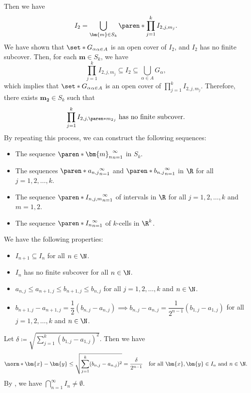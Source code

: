     Then we have
    \[
    I_{2} = \bigcup_{\bm{m} \in S_{k}} \paren*{\prod_{j = 1}^{k} I_{2, j, m_{j}}}.
    \]
    We have shown that $\set*{G_{\alpha}}_{\alpha \in A}$ is an open cover of $I_{2}$, and $I_{2}$ has no finite subcover.
    Then, for each $\bm{m} \in S_{k}$, we have
    \[
    \prod_{j = 1}^{k} I_{2, j, m_{j}} \subseteq I_{2} \subseteq \bigcup_{\alpha \in A} G_{\alpha},
    \]
    which implies that $\set*{G_{\alpha}}_{\alpha \in A}$ is an open cover of
    $\displaystyle \prod_{j = 1}^{k} I_{2, j, m_{j}}$. Therefore, there exists $\bm{m_{2}} \in S_{k}$ such that
    \[
    \prod_{j = 1}^{k} I_{2, j, \paren*{m_{2}}_{j}} \text{ has no finite subcover}.
    \]
    By repeating this process, we can construct the following sequences:
    \begin{itemize}
        \item The sequence $\paren*{\bm{m}_{n}}_{n = 1}^{\infty}$ in $S_{k}$.
        \item The sequences $\paren*{a_{n, j}}_{n = 1}^{\infty}$ and
        $\paren*{b_{n, j}}_{n = 1}^{\infty}$ in $\R$ for all $j = 1, 2, \dots, k$.
        \item The sequence $\paren*{I_{n, j, m}}_{n = 1}^{\infty}$ of intervals in $\R$
        for all $j = 1, 2, \dots, k$ and $m = 1, 2$.
        \item The sequence $\paren*{I_{n}}_{n = 1}^{\infty}$ of $k$-cells in $\R^{k}$.
    \end{itemize}
    We have the following properties:
    \begin{itemize}
        \item $I_{n + 1} \subseteq I_{n}$ for all $n \in \N$.
        \item $I_{n}$ has no finite subcover for all $n \in \N$.
        \item $a_{n, j} \leq a_{n + 1, j} \leq b_{n + 1, j} \leq b_{n, j}$ for all $j = 1, 2, \dots, k$ and $n \in \N$.
        \item $b_{n + 1, j} - a_{n + 1, j} = \dfrac{1}{2}(b_{n, j} - a_{n, j}) \implies b_{n, j} - a_{n, j} =
        \dfrac{1}{2^{n - 1}}(b_{1, j} - a_{1, j})$ for all $j = 1, 2, \dots, k$ and $n \in \N$.
    \end{itemize}
    Let $\delta \coloneqq \displaystyle \sqrt{\sum_{j = 1}^{k} (b_{1, j} - a_{1, j})^{2}}$. Then we have
    \[
    \norm*{\bm{x} - \bm{y}} \leq \sqrt{\sum_{j = 1}^{k} (b_{n, j} - a_{n, j})^{2}} =
    \frac{\delta}{2^{n - 1}} \quad \text{for all } \bm{x}, \bm{y} \in I_{n} \text{ and } n \in \N.
    \]
    By , we have $\displaystyle \bigcap_{n = 1}^{\infty} I_{n} \neq \emptyset$.
